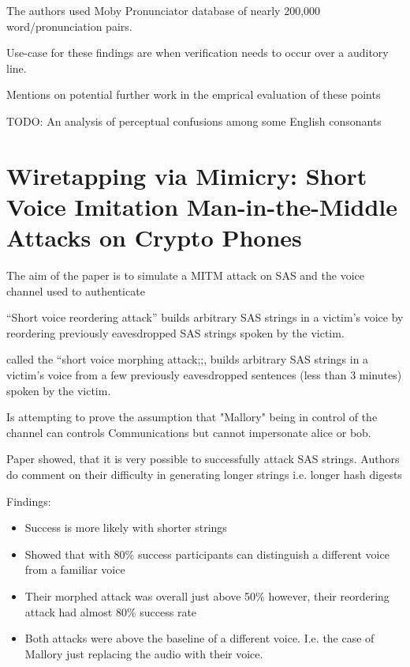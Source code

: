 The authors used Moby Pronunciator database of nearly 200,000 word/pronunciation pairs.

Use-case for these findings are when verification needs to occur over a auditory line.

Mentions on potential further work in the emprical evaluation of these points

TODO: An analysis of perceptual confusions among some English consonants

\newpage

\section{Wiretapping via Mimicry: Short Voice Imitation
Man-in-the-Middle Attacks on Crypto Phones}

The aim of the paper is to simulate a MITM attack on SAS and the voice channel used to authenticate

``Short voice reordering attack'' builds arbitrary SAS
strings in a victim’s voice by reordering previously eavesdropped SAS strings spoken by the victim.

called the ``short voice morphing attack;;, builds arbitrary SAS strings in a victim’s voice from a few previously eavesdropped sentences (less
than 3 minutes) spoken by the victim.

Is attempting to prove the assumption that "Mallory" being in control of the channel can controls Communications but cannot impersonate alice or bob.

Paper showed, that it is very possible to successfully attack SAS strings. Authors do comment on their difficulty in generating longer strings i.e. longer hash digests

Findings:
\begin{itemize}
    \item Success is more likely with shorter strings
    \item Showed that with 80\% success participants can distinguish a different voice from a familiar voice
    \item Their morphed attack was overall just above 50\% however, their reordering attack had almost 80\% success rate
    \item Both attacks were above the baseline of a different voice. I.e. the case of Mallory just replacing the audio with their voice.
\end{itemize}